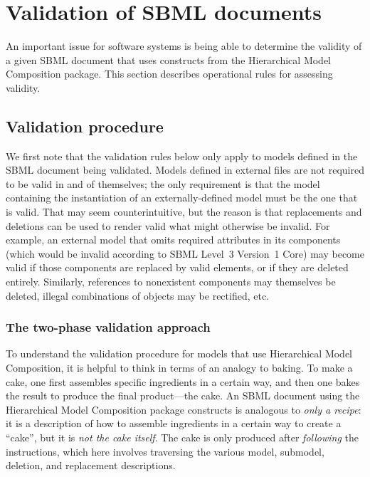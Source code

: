 
\section{Validation of SBML documents}
\label{apdx-validation}

An important issue for software systems is being able to determine the
validity of a given SBML document that uses constructs from the
Hierarchical Model Composition package.  This section describes
operational rules for assessing validity.  


\subsection{Validation procedure}
\label{validation-procedure}

We first note that the validation rules below only apply to models
defined in the SBML document being validated.  Models defined in
external files are not required to be valid in and of themselves; the
only requirement is that the model containing the instantiation of an
externally-defined model must be the one that is valid.  That may seem
counterintuitive, but the reason is that replacements and deletions can
be used to render valid what might otherwise be invalid.  For example,
an external model that omits required attributes in its components
(which would be invalid according to SBML Level~3 Version~1 Core) may
become valid if those components are replaced by valid elements, or if
they are deleted entirely.  Similarly, references to nonexistent
components may themselves be deleted, illegal combinations of objects
may be rectified, etc.


\subsubsection{The two-phase validation approach}

To understand the validation procedure for models that use Hierarchical
Model Composition, it is helpful to think in terms of an analogy to
baking.  To make a cake, one first assembles specific ingredients in a
certain way, and then one bakes the result to produce the final
product---the cake.  An SBML document using the Hierarchical Model
Composition package constructs is analogous to \emph{only a recipe}: it
is a description of how to assemble ingredients in a certain way to
create a ``cake'', but it is \emph{not the cake itself}.  The cake is
only produced after \emph{following} the instructions, which here
involves traversing the various model, submodel, deletion, and
replacement descriptions.

